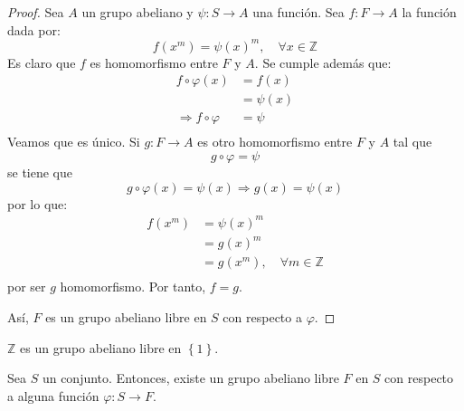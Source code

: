 \documentclass[12pt]{report}
\newcounter{it}
\theoremstyle{largebreak}
\newcommand\cf[3]{\ensuremath{#1:#2\rightarrow#3}}
\begin{document}
    \begin{proof}
        Sea $A$ un grupo abeliano y $\cf{\psi}{S}{A}$ una función. Sea $\cf{f}{F}{A}$ la función dada por:
        \begin{equation*}
            f(x^m)=\psi(x)^m,\quad\forall x\in\mathbb{Z}
        \end{equation*}
        Es claro que $f$ es homomorfismo entre $F$ y $A$. Se cumple además que:
        \begin{equation*}
            \begin{split}
                f\circ\varphi(x)&=f(x)\\
                &=\psi(x)\\
                \Rightarrow f\circ\varphi&=\psi\\
            \end{split}
        \end{equation*}
        Veamos que es único. Si $\cf{g}{F}{A}$ es otro homomorfismo entre $F$ y $A$ tal que
        \begin{equation*}
            g\circ\varphi=\psi
        \end{equation*}
        se tiene que
        \begin{equation*}
            g\circ\varphi(x)=\psi(x)\Rightarrow g(x)=\psi(x)
        \end{equation*}
        por lo que:
        \begin{equation*}
            \begin{split}
                f(x^m)&=\psi(x)^m\\
                &=g(x)^m\\
                &=g(x^m),\quad\forall m\in\mathbb{Z} \\
            \end{split}
        \end{equation*}
        por ser $g$ homomorfismo. Por tanto, $f=g$.

        Así, $F$ es un grupo abeliano libre en $S$ con respecto a $\varphi$.
    \end{proof}

    \begin{exa}
        $\mathbb{Z}$ es un grupo abeliano libre en $\left\{1 \right\}$.
    \end{exa}

    \begin{propo}
        Sea $S$ un conjunto. Entonces, existe un grupo abeliano libre $F$ en $S$ con respecto a alguna función $\cf{\varphi}{S}{F}$.
    \end{propo}
\end{document}
